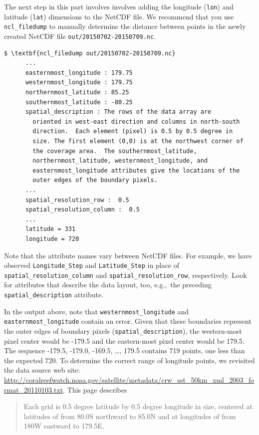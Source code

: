 \documentclass[11pt]{report}
\begin{document}
The next step in this part involves involves adding the longitude (\texttt{lon}) and latitude (\texttt{lat}) dimensions to the NetCDF file.
We recommend that you use \texttt{ncl\_filedump} to manually determine the distance between points in the newly created NetCDF file \texttt{out/20150702-20150709.nc}.
\begin{Verbatim}[xleftmargin=0.5in,commandchars=\\\{\}]
$ \textbf{ncl_filedump out/20150702-20150709.nc}
      ...
      easternmost_longitude : 179.75
      westernmost_longitude : 179.75
      northernmost_latitude : 85.25
      southernmost_latitude : -80.25
      spatial_description : The rows of the data array are
        oriented in west-east direction and columns in north-south
        direction.  Each element (pixel) is 0.5 by 0.5 degree in
        size. The first element (0,0) is at the northwest corner of
        the coverage area.  The southernmost_latitude,
        northernmost_latitude, westernmost_longitude, and
        easternmost_longitude attributes give the locations of the
        outer edges of the boundary pixels.
      ...
      spatial_resolution_row :  0.5
      spatial_resolution_column :  0.5
      ...
      latitude = 331
      longitude = 720
\end{Verbatim}
Note that the attribute names vary between NetCDF files.
For example, we have observed \texttt{Longitude\_Step} and \texttt{Latitude\_Step} in place of \texttt{spatial\_resolution\_column} and \texttt{spatial\_resolution\_row}, respectively.
Look for attributes that describe the data layout, too, e.g.,~the preceding \texttt{spatial\_description} attribute.

In the output above, note that \verb+westernmost_longitude+ and \verb+easternmost_longitude+ contain an error.
Given that these boundaries represent the outer edges of boundary pixels (\verb+spatial_description+), the western-most pixel center would be -179.5 and the eastern-most pixel center would be 179.5.
The sequence -179.5, -179.0, -169.5, \dots, 179.5 contains 719 points, one less than the expected 720.
To determine the correct range of longitude points, we revisited the data source web site: \url{http://coralreefwatch.noaa.gov/satellite/metadata/crw_sst_50km_xml_2003_format_20110103.txt}.
This page describes
\begin{quote}
Each grid is 0.5 degree latitude by 0.5 degree longitude in size, centered at latitudes of from 80.0S northward to 85.0N and at longitudes of from 180W eastward to 179.5E.
\end{quote}
\end{document}

